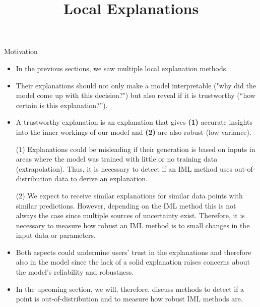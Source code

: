 \documentclass[11pt,compress,t,notes=noshow, xcolor=table]{beamer}
\title{Local Explanations}
\institute{\href{https://compstat-lmu.github.io/lecture_i2ml/}{compstat-lmu.github.io/lecture\_i2ml}}
\date{}
\begin{document}
	










\begin{vbframe}{Motivation}
	\begin{itemize}
		\item In the previous sections, we saw multiple local explanation methods. 
		\item Their explanations should not only make a model interpretable ("why did the model come up with this decision?") but also reveal if it is trustworthy (``how certain is this explanation?'').
		\item A trustworthy explanation is an explanation that gives \textbf{(1)} accurate insights into the inner workings of our model and \textbf{(2)} are also robust (low variance). 
		\item[(1)] Explanations could be misleading if their generation is based on inputs in areas where the model was trained with little or no training data (extrapolation). Thus, it is necessary to detect if an IML method uses out-of-distribution data to derive an explanation. 
		\item[(2)] We expect to receive similar explanations for similar data points with similar predictions. However, depending on the IML method this is not always the case since multiple sources of uncertainty exist. Therefore, it is necessary to measure how robust an IML method is to small changes in the input data or parameters. 
		\item Both aspects could undermine users' trust in the explanations and therefore also in the model since the lack of a solid explanation raises concerns about the model's reliability and robustness. 
		\item In the upcoming section, we will, therefore, discuss methods to detect if a point is out-of-distribution and to measure how robust IML methods are.
	\end{itemize}
\end{vbframe}
\end{document}
